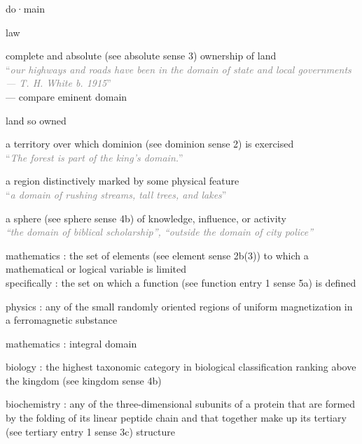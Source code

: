 \documentclass[a4paper, DIV=13, BCOR=0cm]{scrbook}
\begin{document}
\begin{mdframed}[%
	linewidth=1pt,%
	frametitlerule=true,%
	frametitlebackgroundcolor=gray!20,%
	innertopmargin=\topskip,%
	frametitlefont=\normalfont,%
	frametitle={{\textbf{domain}} {\scriptsize\textsc{noun \hfill Merriam-Webster}}}%
	]
	
	{\small do·​main
			\begin{compactenum}
				\item law
				\begin{compactenum}
					\item complete and absolute (see absolute sense 3) ownership of land \\
					\textcolor{gray}{\enquote{\textit{our highways and roads have been in the domain of state and local governments— T. H. White b. 1915}}} \\
					 — compare eminent domain
					\item land so owned
				\end{compactenum}
				\item a territory over which dominion (see dominion sense 2) is exercised \\
				\textcolor{gray}{\enquote{\textit{The forest is part of the king's domain.}}}
				\item a region distinctively marked by some physical feature \\
				\textcolor{gray}{\enquote{\textit{a domain of rushing streams, tall trees, and lakes}}}
				\item a sphere (see sphere sense 4b) of knowledge, influence, or activity \\
				\textcolor{gray}{\textit{\enquote{the domain of biblical scholarship}, \enquote{outside the domain of city police}}}
				\item mathematics : the set of elements (see element sense 2b(3)) to which a mathematical or logical variable is limited \\
				specifically : the set on which a function (see function entry 1 sense 5a) is defined
				\item physics : any of the small randomly oriented regions of uniform magnetization in a ferromagnetic substance
				\item mathematics : integral domain
				\item biology : the highest taxonomic category in biological classification ranking above the kingdom (see kingdom sense 4b)
				\item biochemistry : any of the three-dimensional subunits of a protein that are formed by the folding of its linear peptide chain and that together make up its tertiary (see tertiary entry 1 sense 3c) structure

\end{compactenum}}
\end{mdframed}
\end{document}
